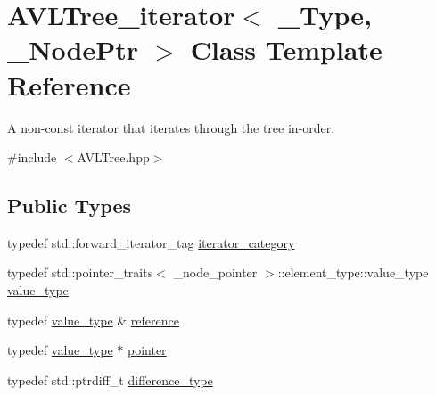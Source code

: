 \hypertarget{class_a_v_l_tree__iterator}{}\section{A\+V\+L\+Tree\+\_\+iterator$<$ \+\_\+\+Type, \+\_\+\+Node\+Ptr $>$ Class Template Reference}
\label{class_a_v_l_tree__iterator}


A non-\/const iterator that iterates through the tree in-\/order.  




{\ttfamily \#include $<$A\+V\+L\+Tree.\+hpp$>$}

\subsection*{Public Types}
\begin{DoxyCompactItemize}
\item 
typedef std\+::forward\+\_\+iterator\+\_\+tag \hyperlink{class_a_v_l_tree__iterator_aeb3e2ca18b485bfb0328a6a66e798f7e}{iterator\+\_\+category}
\item 
typedef std\+::pointer\+\_\+traits$<$ \+\_\+node\+\_\+pointer $>$\+::element\+\_\+type\+::value\+\_\+type \hyperlink{class_a_v_l_tree__iterator_adad51d3a8cc80149c12d9eb311f979fc}{value\+\_\+type}
\item 
typedef \hyperlink{class_a_v_l_tree__iterator_adad51d3a8cc80149c12d9eb311f979fc}{value\+\_\+type} \& \hyperlink{class_a_v_l_tree__iterator_a67cbb11da40a9e4a517bb9a082590d5a}{reference}
\item 
typedef \hyperlink{class_a_v_l_tree__iterator_adad51d3a8cc80149c12d9eb311f979fc}{value\+\_\+type} $\ast$ \hyperlink{class_a_v_l_tree__iterator_ab3060d2f8d96febec03250b59b9d6c5b}{pointer}
\item 
typedef std\+::ptrdiff\+\_\+t \hyperlink{class_a_v_l_tree__iterator_ac6fc6dee98fa0759f9ae3081ae6e4038}{difference\+\_\+type}
\end{DoxyCompactItemize}

